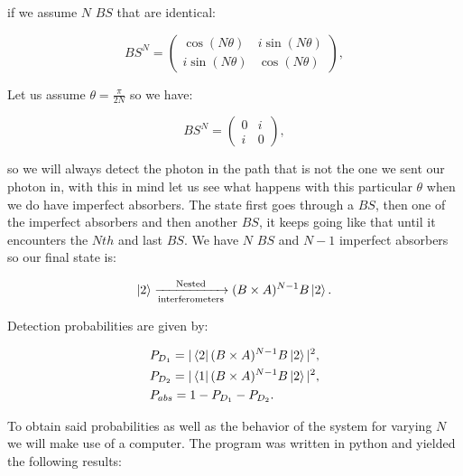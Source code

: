 \documentclass{book}
\begin{document}
if we assume $N$ $BS$ that are identical:

\begin{equation}
BS^{N}=\begin{pmatrix} \cos(N\theta) & i \sin(N\theta) \\ i \sin(N\theta) & \cos(N\theta) \end{pmatrix},
\end{equation}

Let us assume $\theta=\frac{\pi}{2N}$ so we have:

\begin{equation}
BS^{N}=\begin{pmatrix} 0 & i  \\ i  & 0 \end{pmatrix},
\end{equation}

so we will always detect the photon in the path that is not the one we sent our photon in, with this in mind let us see what happens with this particular $\theta$ when we do have imperfect absorbers. The state first goes through a $BS$, then one of the imperfect absorbers and then another $BS$, it keeps going like that until it encounters the $Nth$ and last $BS$. We have $N$ $BS$ and $N-1$ imperfect absorbers so our final state is:


\begin{equation}\ket{2}\xrightarrow[\text{interferometers}]{\text{Nested}}(B \times A)^{N-1}B \ket{2}.
\end{equation}

Detection probabilities are given by:

\begin{align}
&P_{D_{1}}=|\bra{2} (B \times A)^{N-1}B \ket{2}|^2,\\
&P_{D_{2}}=|\bra{1} (B \times A)^{N-1}B \ket{2}|^2,\\
&P_{abs}=1-P_{D_{1}}-P_{D_{2}}.
\end{align}
 
 
To obtain said probabilities as well as the behavior of the system for varying $N$ we will make use of a computer. The program was written in python and yielded the following results:
\end{document}
